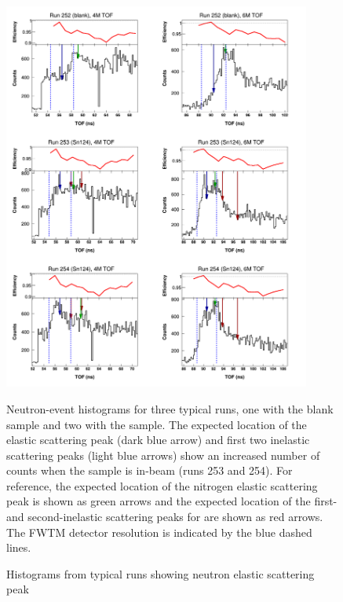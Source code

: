\begin{figure}[ht]
    \centering
    \includegraphics[width=0.9\textwidth]{figures/tiledRunData.png}
    \caption{Histograms from typical runs showing neutron elastic scattering peak} 
    {
        Neutron-event histograms for three typical runs, one with the blank
        sample and two with the \snFour sample.
        The expected location of the \snFour elastic scattering peak (dark blue arrow)
        and first two inelastic scattering peaks (light blue arrows) show an
        increased number of counts when the sample is in-beam (runs 253 and
        254). For reference, the expected location of the nitrogen elastic scattering
        peak is shown as green arrows and the expected location of the first- and
        second-inelastic scattering peaks for \snFour are shown as red arrows.
        The FWTM detector resolution is indicated by the blue dashed lines.
    }
    \label{tiledRunData}
\end{figure}

